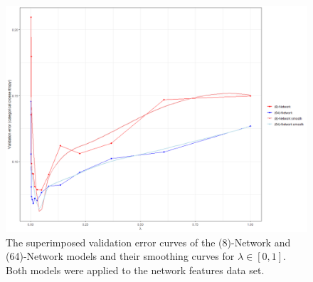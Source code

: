 \begin{figure}
	\begin{center}
		\includegraphics[scale = 0.5]{fig/CH3/model_comp_network_HL.png}
		\caption{The superimposed validation error curves of the (8)-Network and (64)-Network models and their smoothing curves for $\lambda \in [0,1]$. Both models were applied to the network features data set.}
		\label{fig:ch3_nn_validation_compare_network}
	\end{center}	
\end{figure}

